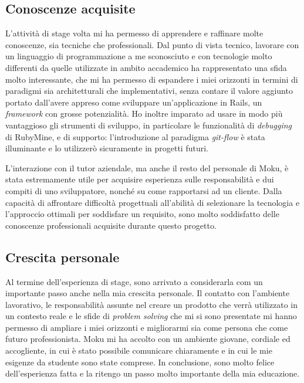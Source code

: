 \subsection{Conoscenze acquisite}
L'attività di stage volta mi ha permesso di apprendere e raffinare molte conoscenze, sia tecniche che professionali. Dal punto di vista tecnico, lavorare con un linguaggio di programmazione a me sconosciuto e con tecnologie molto differenti da quelle utilizzate in ambito accademico ha rappresentato una sfida molto interessante, che mi ha permesso di espandere i miei orizzonti in termini di paradigmi sia architetturali che implementativi, senza contare il valore aggiunto portato dall'avere appreso come sviluppare un'applicazione in Rails, un \textit{framework} con grosse potenzialità. Ho inoltre imparato ad usare in modo più vantaggioso gli strumenti di sviluppo, in particolare le funzionalità di \textit{debugging} di RubyMine, e di supporto: l'introduzione al paradigma \textit{git-flow} è stata illuminante e lo utilizzerò sicuramente in progetti futuri.

L'interazione con il tutor aziendale, ma anche il resto del personale di Moku, è stata estremamente utile per acquisire esperienza sulle responsabilità e dui compiti di uno sviluppatore, nonché su come rapportarsi ad un cliente. Dalla capacità di affrontare difficoltà progettuali all'abilità di selezionare la tecnologia e l'approccio ottimali per soddisfare un requisito, sono molto soddisfatto delle conoscenze professionali acquisite durante questo progetto.

\subsection{Crescita personale}
Al termine dell'esperienza di stage, sono arrivato a considerarla com un importante passo anche nella mia crescita personale. Il contatto con l'ambiente lavorativo, le responsabilità assunte nel creare un prodotto che verrà utilizzato in un contesto reale e le sfide di \textit{problem solving} che mi si sono presentate mi hanno permesso di ampliare i miei orizzonti e migliorarmi sia come persona che come futuro professionista. Moku mi ha accolto con un ambiente giovane, cordiale ed accogliente, in cui è stato possibile comunicare chiaramente e in cui le mie esigenze da studente sono state comprese. In conclusione, sono molto felice dell'esperienza fatta e la ritengo un passo molto importante della mia educazione.